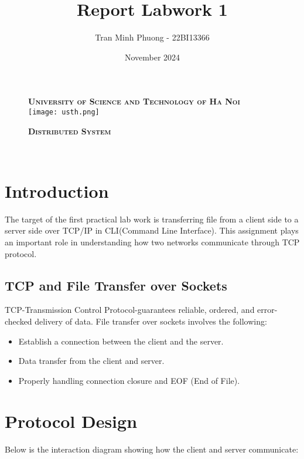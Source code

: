 \documentclass{article}
\title{Report Labwork 1}
\author{
    Tran Minh Phuong - 22BI13366\\  
}
\date{November 2024}
\begin{document}
\begin{figure}[H]
    \textsc{\large \bfseries University of Science and Technology of Ha Noi}\\[0.5cm]
    \centering
    \texttt{[image: usth.png]}
    \label{fig:project-overview}

    \vspace{1cm}
 
    \vspace{1cm}

    \textsc{\Large \bfseries Distributed System}\\[1cm]
    
\end{figure}


\vspace{1cm}
\begin{center}
    \huge \textbf{\thetitle} \\[0.5cm]
    \Large \theauthor [0.5cm]
    \large \thedate
\end{center}

\vspace{4cm}
\newpage
\tableofcontents

\newpage
\section{Introduction}
The target of the first practical lab work is transferring file from a client side to a server side over TCP/IP in CLI(Command Line Interface). This assignment plays an important role in understanding how two networks communicate through TCP protocol.

\subsection{TCP and File Transfer over Sockets}
TCP-Transmission Control Protocol-guarantees reliable, ordered, and error-checked delivery of data. File transfer over sockets involves the following:
\begin{itemize}
    \item Establish a connection between the client and the server.
    \item Data transfer from the client and server.
    \item Properly handling connection closure and EOF (End of File).
\end{itemize}

\section{Protocol Design}
Below is the interaction diagram showing how the client and server communicate:
\end{document}
